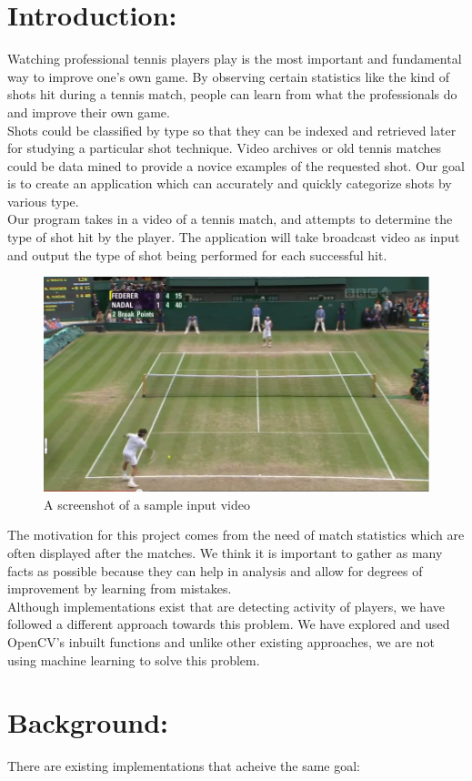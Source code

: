 \documentclass[10.5pt]{proc}
\begin{document}
  \section{Introduction:}
  Watching professional tennis players play is the most important and fundamental way to improve one's own game. By observing certain statistics like the kind of shots hit during a tennis match, people can learn from what the professionals do and improve their own game.\\
      Shots could be classified by type so that they can be indexed and retrieved later for studying a particular shot technique. Video archives or old tennis matches could be data mined to provide a novice examples of the requested shot. Our goal is to create an application which can accurately and quickly categorize shots by various type.\\
  Our program takes in a video of a tennis match, and attempts to determine the type of shot hit by the player. The application will take broadcast video as input and output the type of shot being performed for each successful hit.\\[4pt]
    \begin{figure}[h]
    \centering
	\includegraphics[width=.47\textwidth]{forehand.png}
	\caption{A screenshot of a sample input video}
	\end{figure}
    The motivation for this project comes from the need of match statistics which are often displayed after the matches. We think it is important to gather as many facts as possible because they can help in analysis and allow for degrees of improvement by learning from mistakes.\\
	Although implementations exist that are detecting activity of players, we have followed a different approach towards this problem. We have explored and used OpenCV's inbuilt functions and unlike other existing approaches, we are not using machine learning to solve this problem.
    
    \section{Background:}
    There are existing implementations that acheive the same goal:
\end{document}
